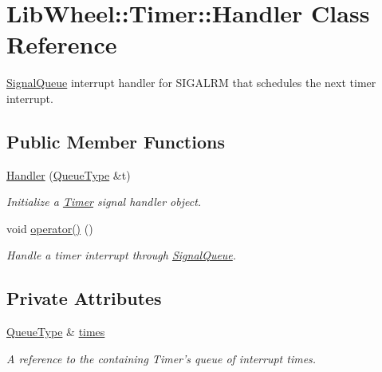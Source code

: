 \hypertarget{classLibWheel_1_1Timer_1_1Handler}{
\section{\-Lib\-Wheel\-:\-:\-Timer\-:\-:\-Handler \-Class \-Reference}
\label{classLibWheel_1_1Timer_1_1Handler}
}


\hyperlink{classLibWheel_1_1SignalQueue}{\-Signal\-Queue} interrupt handler for \-S\-I\-G\-A\-L\-R\-M that schedules the next timer interrupt.  


\subsection*{\-Public \-Member \-Functions}
\begin{DoxyCompactItemize}
\item 
\hyperlink{classLibWheel_1_1Timer_1_1Handler_a06c02f21d511eae1753f70a2a5835951}{\-Handler} (\hyperlink{classLibWheel_1_1Timer_abea53b00b28de4989a20f6719d3c7b82}{\-Queue\-Type} \&t)
\begin{DoxyCompactList}\small\item\em \-Initialize a \hyperlink{classLibWheel_1_1Timer}{\-Timer} signal handler object. \end{DoxyCompactList}\item 
void \hyperlink{classLibWheel_1_1Timer_1_1Handler_ae2eb3e8860288ffcd839b2917847f7b4}{operator()} ()
\begin{DoxyCompactList}\small\item\em \-Handle a timer interrupt through \hyperlink{classLibWheel_1_1SignalQueue}{\-Signal\-Queue}. \end{DoxyCompactList}\end{DoxyCompactItemize}
\subsection*{\-Private \-Attributes}
\begin{DoxyCompactItemize}
\item 
\hyperlink{classLibWheel_1_1Timer_abea53b00b28de4989a20f6719d3c7b82}{\-Queue\-Type} \& \hyperlink{classLibWheel_1_1Timer_1_1Handler_af2ecd2ad93ee6fa4989e8aac35e747d8}{times}
\begin{DoxyCompactList}\small\item\em \-A reference to the containing \-Timer's queue of interrupt times. \end{DoxyCompactList}\end{DoxyCompactItemize}


